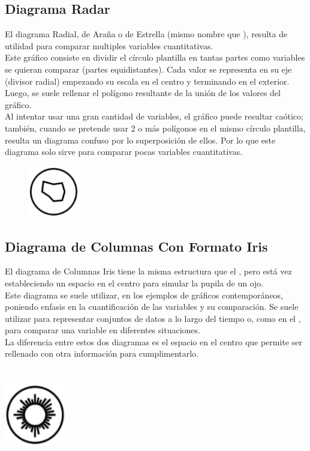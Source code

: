\documentclass{article}\usepackage[]{graphicx}\usepackage[]{color}
\begin{document}
\subsection{Diagrama Radar}
El diagrama Radial, de Ara\~na o de Estrella (mismo nombre que ), resulta de utilidad para comparar multiples variables cuantitativas.~\\
Este gr\'afico consiste en dividir el c\'irculo plantilla en tantas partes como variables se quieran comparar (partes equidistantes). Cada valor se representa en su eje (divisor radial) empezando su escala en el centro y terminando en el exterior. Luego, se suele rellenar el pol\'igono resultante de la uni\'on de los valores del gr\'afico.~\\
Al intentar usar una gran cantidad de variables, el gr\'afico puede resultar ca\'otico; tambi\'en, cuando se pretende usar 2 o m\'as pol\'igonos en el mismo c\'irculo plantilla, resulta un diagrama confuso por lo superposici\'on de ellos. Por lo que este diagrama solo sirve para comparar pocas variables cuantitativas.
~\\
\begin{figure}[h]
    \centering
    \includegraphics[width=0.2\textwidth]{imag/radar}
\end{figure}
\subsection{Diagrama de Columnas Con Formato Iris}
El diagrama de Columnas Iris tiene la misma estructura que el , pero est\'a vez estableciendo un espacio en el centro para simular la pupila de un ojo.~\\
Este diagrama se suele utilizar, en los ejemplos de gr\'aficos contempor\'aneos, poniendo enfasis en la cuantificaci\'on de las variables y su comparaci\'on. Se suele utilizar para representar conjuntos de datos a lo largo del tiempo o, como en el , para comparar una variable en diferentes situaciones.~\\
La diferencia entre estos dos diagramas es el espacio en el centro que permite ser rellenado con otra informaci\'on para cumplimentarlo.
~\\~\\~\\
\vbox{
    \centering
    \includegraphics[width=0.2\textwidth]{imag/columnas_sep}
}
\clearpage
\end{document}
